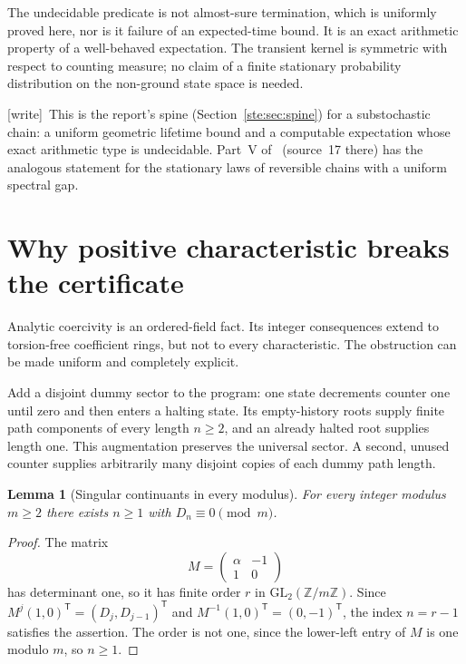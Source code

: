 \documentclass[11pt,letterpaper]{article}
\newtheorem{lemma}[theorem]{Lemma}
\theoremstyle{definition}
\theoremstyle{remark}
\newcommand{\Z}{\mathbb Z}
\newcommand{\wtag}{\textup{[write]}}
\begin{document}
The undecidable predicate is not almost-sure termination, which is
uniformly proved here, nor is it failure of an expected-time bound. It is
an exact arithmetic property of a well-behaved expectation. The transient
kernel is symmetric with respect to counting measure; no claim of a
finite stationary probability distribution on the non-ground state space
is needed.

\wtag\ This is the report's spine (Section~\ref{ste:sec:spine}) for a substochastic chain: a uniform geometric lifetime bound and a computable expectation whose exact arithmetic type is undecidable. Part~V of~\cite{pqc} (source~17 there) has the analogous statement for the stationary laws of reversible chains with a uniform spectral gap.

\section{Why positive characteristic breaks the certificate}\label{ste:cg:sec:characteristic}
Analytic coercivity is an ordered-field fact. Its integer consequences
extend to torsion-free coefficient rings, but not to every characteristic.
The obstruction can be made uniform and completely explicit.

Add a disjoint dummy sector to the program: one state decrements counter
one until zero and then enters a halting state. Its empty-history roots
supply finite path components of every length $n\ge2$, and an already
halted root supplies length one. This augmentation preserves the universal
sector. A second, unused counter supplies arbitrarily many disjoint copies
of each dummy path length.

\begin{lemma}[Singular continuants in every modulus]\label{ste:cg:lem:modular}
For every integer modulus $m\ge2$ there exists $n\ge1$ with
$D_n\equiv0\pmod m$.
\end{lemma}
\begin{proof}
The matrix
\[
 M=\begin{pmatrix}\alpha&-1\\1&0\end{pmatrix}
\]
has determinant one, so it has finite order $r$ in
$\mathrm{GL}_2(\Z/m\Z)$. Since
$M^j(1,0)^{\mathsf T}=(D_j,D_{j-1})^{\mathsf T}$ and
$M^{-1}(1,0)^{\mathsf T}=(0,-1)^{\mathsf T}$, the index $n=r-1$
satisfies the assertion. The order is not one, since the lower-left entry
of $M$ is one modulo $m$, so $n\ge1$.
\end{proof}
\end{document}

